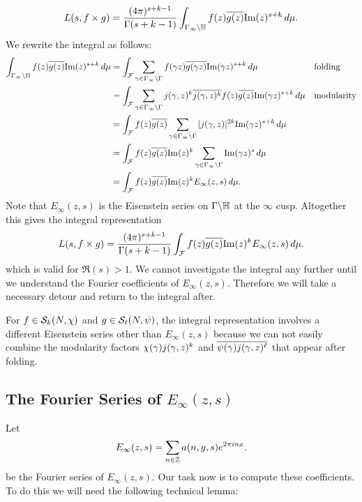       \[
        L(s,f \times g) = \frac{(4\pi)^{s+k-1}}{\Gamma(s+k-1)}\int_{\Gamma_{\infty}\backslash\mathbb{H}}f(z)\overline{g(z)}\mathrm{Im}(z)^{s+k}\,d\mu.
      \]
      We rewrite the integral as follows:
      \begin{align*}
        \int_{\Gamma_{\infty}\backslash\mathbb{H}}f(z)\overline{g(z)}\mathrm{Im}(z)^{s+k}\,d\mu &= \int_{\mathcal{F}}\sum_{\gamma \in \Gamma_{\infty}\backslash\Gamma}f(\gamma z)\overline{g(\gamma z)}\mathrm{Im}(\gamma z)^{s+k}\,d\mu && \text{folding} \\
        &= \int_{\mathcal{F}}\sum_{\gamma \in \Gamma_{\infty}\backslash\Gamma}j(\gamma,z)^{k}\overline{j(\gamma,z)^{k}}f(z)\overline{g(z)}\mathrm{Im}(\gamma z)^{s+k}\,d\mu && \text{modularity} \\
        &= \int_{\mathcal{F}}f(z)\overline{g(z)}\sum_{\gamma \in \Gamma_{\infty}\backslash\Gamma}|j(\gamma,z)|^{2k}\mathrm{Im}(\gamma z)^{s+k}\,d\mu \\
        &= \int_{\mathcal{F}}f(z)\overline{g(z)}\mathrm{Im}(z)^{k}\sum_{\gamma \in \Gamma_{\infty}\backslash\Gamma}\mathrm{Im}(\gamma z)^{s}\,d\mu \\
        &= \int_{\mathcal{F}}f(z)\overline{g(z)}\mathrm{Im}(z)^{k}E_{\infty}(z,s)\,d\mu.
      \end{align*}
      Note that $E_{\infty}(z,s)$ is the Eisenstein series on $\Gamma\backslash\mathbb{H}$ at the $\infty$ cusp. Altogether this gives the integral representation
      \begin{equation}\label{equ:Rankin-Selberg_integral-reresentation}
        L(s,f \times g) =  \frac{(4\pi)^{s+k-1}}{\Gamma(s+k-1)}\int_{\mathcal{F}}f(z)\overline{g(z)}\mathrm{Im}(z)^{k}E_{\infty}(z,s)\,d\mu.
      \end{equation}
      which is valid for $\Re(s) > 1$. We cannot investigate the integral any further until we understand the Fourier coefficients of $E_{\infty}(z,s)$. Therefore we will take a necessary detour and return to the integral after.

      \begin{remark}
        For $f \in \mathcal{S}_{k}(N,\chi)$ and $g \in \mathcal{S}_{\ell}(N,\psi)$, the integral representation involves a different Eisenstein series other than $E_{\infty}(z,s)$ because we can not easily combine the modularity factors $\chi(\gamma)j(\gamma,z)^{k}$ and $\overline{\psi(\gamma)j(\gamma,z)^{\ell}}$ that appear after folding.
      \end{remark}
    \subsection*{The Fourier Series of \texorpdfstring{$E_{\infty}(z,s)$}{E_{\infty}(z,s)}}
      Let
      \[
        E_{\infty}(z,s) = \sum_{n \in \mathbb{Z}}a(n,y,s)e^{2\pi inx}.
      \]
      be the Fourier series of $E_{\infty}(z,s)$. Our task now is to compute these coefficients. To do this we will need the following technical lemma:


